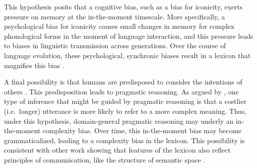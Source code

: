
\hspace*{.3 cm}{ \it 3.\ The Memory Hypothesis.} This hypothesis posits that a cognitive bias, such as a bias for iconicity, exerts pressure on memory at the in-the-moment timescale. More specifically, a psychological bias for iconicity causes small changes in memory for complex phonological forms in the moment of language interaction, and  this  pressure leads to biases in linguistic transmission across generations. Over the course of language evolution, these psychological, synchronic biases result in a lexicon that magnifies this bias  \cite{griffiths2007language}. 


\hspace*{.3 cm}{ \it 4.\ The Pragmatic Hypothesis. } A final possibility is that humans are predisposed to consider the intentions of others \cite{tomasello2005understanding}. This predisposition leads to pragmatic reasoning. As argued by , one type of inference that might be guided by pragmatic reasoning is that a costlier (i.e.\ longer) utterance is more likely to refer to a more complex meaning. Thus, under this hypothesis, domain-general pragmatic reasoning may underly an in-the-moment complexity bias. Over time, this in-the-moment bias may become grammaticalized, leading to a complexity bias in the lexicon. This possibility is consistent with other work showing that features of the lexicon also reflect principles of communication, like the structure of semantic space \cite{regier2007color,kemp2012kinship,piantadosi2012communicative}. 



